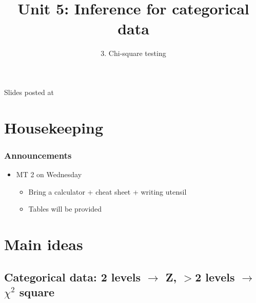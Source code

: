 \documentclass[slidestop,compress,mathserif,12pt,t,professionalfonts,xcolor=table]{beamer}
\title{Unit 5: Inference for categorical data}
\subtitle{3. Chi-square testing}
\author{\CourseName}
\date{}
\institute{\InstituteName}
\begin{document}



\begin{frame}[plain]

\titlepage

\vfill

{\scriptsize {} \hfill Slides posted at  \webURL{\CourseSite}}

\addtocounter{framenumber}{-1} 

\end{frame}


\section{Housekeeping}


\begin{frame}
\frametitle{Announcements}

\begin{itemize}

\item MT 2 on Wednesday
\begin{itemize}
\item Bring a calculator + cheat sheet + writing utensil
\item Tables will be provided
\end{itemize}

\end{itemize}

\end{frame}


\section{Main ideas}


\subsection{Categorical data: 2 levels $\rightarrow$ Z, $>$2 levels $\rightarrow$ $\chi^2$ square}
\label{mi1}

\end{document}
